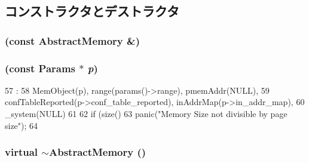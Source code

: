 \subsection{コンストラクタとデストラクタ}
\hypertarget{classAbstractMemory_abe7c4ad03729f9b3dd25d3dc43361103}{
\subsubsection[{AbstractMemory}]{ (const {\bf AbstractMemory} \&)}}
\label{classAbstractMemory_abe7c4ad03729f9b3dd25d3dc43361103}
\hypertarget{classAbstractMemory_a69baeab8b9f1056447fe16519fd89923}{
\subsubsection[{AbstractMemory}]{ (const {\bf Params} $\ast$ {\em p})}}
\label{classAbstractMemory_a69baeab8b9f1056447fe16519fd89923}



\begin{DoxyCode}
57                                               :
58     MemObject(p), range(params()->range), pmemAddr(NULL),
59     confTableReported(p->conf_table_reported), inAddrMap(p->in_addr_map),
60     _system(NULL)
61 {
62     if (size() %
63         panic("Memory Size not divisible by page size\n");
64 }

\end{DoxyCode}
\hypertarget{classAbstractMemory_a7cff70b609d2b2b8ac45e1fe12b7bc96}{
\subsubsection[{$\sim$AbstractMemory}]{\setlength{\rightskip}{0pt plus 5cm}virtual $\sim${\bf AbstractMemory} ()}}
\label{classAbstractMemory_a7cff70b609d2b2b8ac45e1fe12b7bc96}



